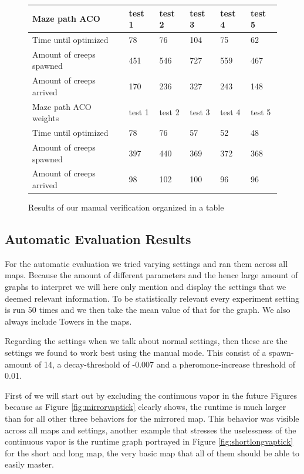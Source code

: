 \begin{figure}[H]
\begin{tabular}{|l|l|l|l|l|l|}
		Maze path ACO & test 1 & test 2 & test 3 & test 4 & test 5 \\\hline
		Time until optimized      & 78     & 76     & 104    & 75     & 62     \\
		Amount of creeps spawned  & 451    & 546    & 727    & 559    & 467    \\
		Amount of creeps arrived  & 170    & 236    & 327    & 243    & 148    \\\hline
		
		Maze path ACO weights & test 1 & test 2 & test 3 & test 4 & test 5 \\\hline
		Time until optimized              & 78     & 76     & 57     & 52     & 48     \\
		Amount of creeps spawned          & 397    & 440    & 369    & 372    & 368    \\
		Amount of creeps arrived          & 98     & 102    & 100    & 96     & 96     \\\hline
	\end{tabular}
	\label{fig:manres}
	\caption{Results of our manual verification organized in a table}
\end{figure}


\subsection{Automatic Evaluation Results}
\label{sec:autover}
For the automatic evaluation we tried varying settings and ran them across all maps. Because the amount of different parameters and the hence large amount of graphs to interpret we will here only mention and display the settings that we deemed relevant information. To be statistically relevant every experiment setting is run 50 times and we then take the mean value of that for the graph. We also always include Towers in the maps.

Regarding the settings when we talk about normal settings, then these are the settings we found to work best using the manual mode. This consist of a spawn-amount of 14, a decay-threshold of -0.007 and a pheromone-increase threshold of 0.01.

First of we will start out by excluding the continuous vapor in the future Figures because as Figure \ref{fig:mirrorvaptick} clearly shows, the runtime is much larger than for all other three behaviors for the mirrored map. This behavior was visible across all maps and settings, another example that stresses the uselessness of the continuous vapor is the runtime graph portrayed in Figure \ref{fig:shortlongvaptick} for the short and long map, the very basic map that all of them should be able to easily master.

